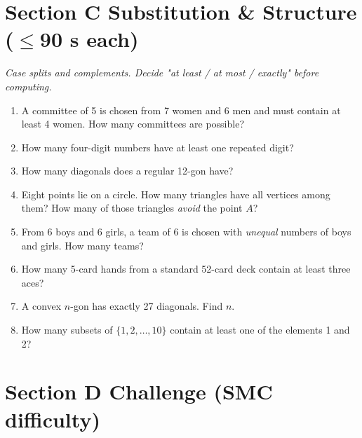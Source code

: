 \documentclass[11pt,a4paper]{article}
\begin{document}
\section*{Section C \quad Substitution \& Structure \hfill{\normalfont\small($\leq$90 s each)}}

\noindent\textit{Case splits and complements. Decide "at least / at most / exactly" before computing.}

\begin{enumerate}

\item A committee of 5 is chosen from 7 women and 6 men and must contain at least 4 women. How many committees are possible?

\item How many four-digit numbers have at least one repeated digit?

\item How many diagonals does a regular 12-gon have?

\item Eight points lie on a circle. How many triangles have all vertices among them? How many of those triangles \emph{avoid} the point $A$?

\item From 6 boys and 6 girls, a team of 6 is chosen with \emph{unequal} numbers of boys and girls. How many teams?

\item How many 5-card hands from a standard 52-card deck contain at least three aces?

\item A convex $n$-gon has exactly 27 diagonals. Find $n$.

\item How many subsets of $\{1,2,\ldots,10\}$ contain at least one of the elements 1 and 2?

\end{enumerate}

\section*{Section D \quad Challenge \hfill{\normalfont\small(SMC difficulty)}}
\end{document}
